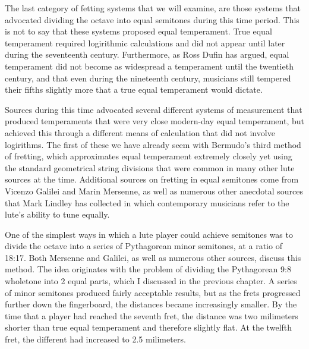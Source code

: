 The last category of fetting systems that we will examine, are those systems that advocated
dividing the octave into equal semitones during this time period.  This is not to say that these
systems proposed equal temperament.  True
equal temperament required logirithmic calculations and did not appear until later during the
seventeenth century.  Furthermore, as Ross Dufin has argued, equal temperament did not become
as widespread a temperament until the twentieth century, and that even during the nineteenth
century, musicians still tempered their fifths slightly more that a true equal temperament would
dictate.

Sources during this time advocated several different systems of measurement that produced
temperaments that were very close modern-day equal temperament, but achieved this through
a different means of calculation that did not involve logirithms.  The first of these
we have already seem with Bermudo's third method of fretting, which approximates equal temperament
extremely closely yet using the standard geometrical string divisions that were common in many
other lute sources at the time.  Additional sources on
fretting in equal semitones come from Vicenzo Galilei and Marin Mersenne, as well as
numerous other anecdotal sources that Mark Lindley has collected in which contemporary
musicians refer to the lute's ability to tune equally.

One of the simplest ways in which a lute player could achieve
semitones was to divide the octave into a series of Pythagorean minor semitones, at a ratio of
18:17.  Both Mersenne and Galilei, as well as numerous other sources, discuss this method.  The
idea originates with the problem of dividing the Pythagorean 9:8 wholetone into 2 equal parts,
which I discussed in the previous chapter.  A series of minor semitones produced fairly
acceptable results, but as the frets progressed further down the fingerboard, the distances
became increasingly smaller.  By the time that a player had reached the seventh fret, the distance
was two milimeters shorter than true equal temperament and therefore slightly flat.  At the
twelfth fret, the different had increased to 2.5 milimeters.

